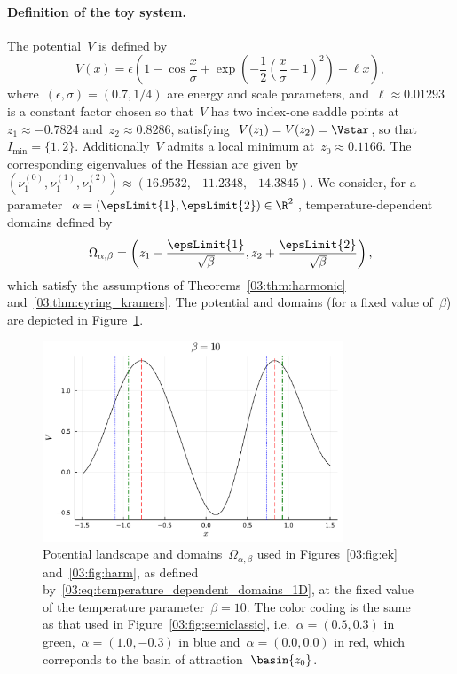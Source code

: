 \paragraph{Definition of the toy system.}
The potential~$V$ is defined by
\begin{equation}
    \label{03:eq:one_d_pot}
    V(x) = \epsilon\left(1-\cos\frac{x}{\sigma} + \exp\left(-\frac12\left(\frac{x}{\sigma}-1\right)^2\right) + \ell x\right),
\end{equation}
where~$(\epsilon,\sigma) = (0.7,1/4)$ are energy and scale parameters, and~$\ell \approx 0.01293$ is a constant factor chosen so that~$V$ has two index-one saddle points at~$z_1 \approx -0.7824$ and~$z_2\approx 0.8286$, satisfying~$V(z_1)=V(z_2)=\Vstar$, so that~$I_{\min}=\{1,2\}$.
Additionally~$V$ admits a local minimum at~$z_0\approx 0.1166$. The corresponding eigenvalues of the Hessian are given by~$(\nu^{(0)}_1,\nu^{(1)}_1,\nu^{(2)}_1)\approx (16.9532,-11.2348,-14.3845)$.
We consider, for a parameter~$\alpha = (\epsLimit{1},\epsLimit{2})\in \R^2$, temperature-dependent domains defined by
\begin{equation}
    \label{03:eq:temperature_dependent_domains_1D}
    \Omega_{\alpha,\beta} = \left(z_1-\frac{\epsLimit{1}}{\sqrt\beta},z_2+\frac{\epsLimit{2}}{\sqrt\beta}\right),
\end{equation}
which satisfy the assumptions of Theorems~\ref{03:thm:harmonic} and~\ref{03:thm:eyring_kramers}. The potential and domains (for a fixed value of~$\beta$) are depicted in Figure~\ref{03:fig:pot}.
\begin{figure}
    \includegraphics[width=0.8\textwidth]{figures/03/semiclassic/V.pdf}
    \caption[]{Potential landscape and domains~$\Omega_{\alpha,\beta}$ used in Figures~\ref{03:fig:ek} and~\ref{03:fig:harm}, as defined by~\eqref{03:eq:temperature_dependent_domains_1D}, at the fixed value of the temperature parameter~$\beta=10$. The color coding is the same as that used in Figure~\ref{03:fig:semiclassic}, i.e.~$\alpha=(0.5,0.3)$ in green,~$\alpha=(1.0,-0.3)$ in blue and~$\alpha=(0.0,0.0)$ in red, which correponds to the basin of attraction~$\basin{z_0}$.}
    \label{03:fig:pot}
\end{figure}

